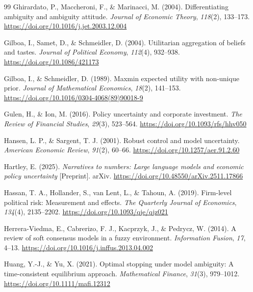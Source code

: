 \begin{thebibliography}{99}
Ghirardato, P., Maccheroni, F., \& Marinacci, M. (2004). Differentiating ambiguity and ambiguity attitude. \emph{Journal of Economic Theory}, \emph{118}(2), 133--173. \url{https://doi.org/10.1016/j.jet.2003.12.004}

Gilboa, I., Samet, D., \& Schmeidler, D. (2004). Utilitarian aggregation of beliefs and tastes. \emph{Journal of Political Economy}, \emph{112}(4), 932--938. \url{https://doi.org/10.1086/421173}

Gilboa, I., \& Schmeidler, D. (1989). Maxmin expected utility with non-unique prior. \emph{Journal of Mathematical Economics}, \emph{18}(2), 141--153. \url{https://doi.org/10.1016/0304-4068(89)90018-9}

Gulen, H., \& Ion, M. (2016). Policy uncertainty and corporate investment. \emph{The Review of Financial Studies}, \emph{29}(3), 523--564. \url{https://doi.org/10.1093/rfs/hhv050}

Hansen, L. P., \& Sargent, T. J. (2001). Robust control and model uncertainty. \emph{American Economic Review}, \emph{91}(2), 60--66. \url{https://doi.org/10.1257/aer.91.2.60}

Hartley, E. (2025). \emph{Narratives to numbers: Large language models and economic policy uncertainty} [Preprint]. arXiv. \url{https://doi.org/10.48550/arXiv.2511.17866}

Hassan, T. A., Hollander, S., van Lent, L., \& Tahoun, A. (2019). Firm-level political risk: Measurement and effects. \emph{The Quarterly Journal of Economics}, \emph{134}(4), 2135--2202. \url{https://doi.org/10.1093/qje/qjz021}

Herrera-Viedma, E., Cabrerizo, F. J., Kacprzyk, J., \& Pedrycz, W. (2014). A review of soft consensus models in a fuzzy environment. \emph{Information Fusion}, \emph{17}, 4--13. \url{https://doi.org/10.1016/j.inffus.2013.04.002}

Huang, Y.-J., \& Yu, X. (2021). Optimal stopping under model ambiguity: A time-consistent equilibrium approach. \emph{Mathematical Finance}, \emph{31}(3), 979--1012. \url{https://doi.org/10.1111/mafi.12312}


\end{thebibliography}
